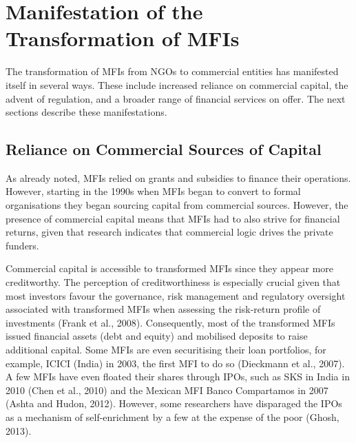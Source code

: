 \documentclass[a4paper, nobind]{templates/ociamthesis}
\begin{document}
\hypertarget{manifestation-of-the-transformation-of-mfis}{%
\section{Manifestation of the Transformation of MFIs}\label{manifestation-of-the-transformation-of-mfis}}

\noindent The transformation of MFIs from NGOs to commercial entities has manifested itself in several ways. These include increased reliance on commercial capital, the advent of regulation, and a broader range of financial services on offer. The next sections describe these manifestations.

\hypertarget{reliance-on-commercial-sources-of-capital}{%
\subsection{Reliance on Commercial Sources of Capital}\label{reliance-on-commercial-sources-of-capital}}

\noindent As already noted, MFIs relied on grants and subsidies to finance their operations. However, starting in the 1990s when MFIs began to convert to formal organisations they began sourcing capital from commercial sources. However, the presence of commercial capital means that MFIs had to also strive for financial returns, given that research indicates that commercial logic drives the private funders.

Commercial capital is accessible to transformed MFIs since they appear more creditworthy. The perception of creditworthiness is especially crucial given that most investors favour the governance, risk management and regulatory oversight associated with transformed MFIs when assessing the risk-return profile of investments (Frank et al., 2008). Consequently, most of the transformed MFIs issued financial assets (debt and equity) and mobilised deposits to raise additional capital. Some MFIs are even securitising their loan portfolios, for example, ICICI (India) in 2003, the first MFI to do so (Dieckmann et al., 2007). A few MFIs have even floated their shares through IPOs, such as SKS in India in 2010 (Chen et al., 2010) and the Mexican MFI Banco Compartamos in 2007 (Ashta and Hudon, 2012). However, some researchers have disparaged the IPOs as a mechanism of self-enrichment by a few at the expense of the poor (Ghosh, 2013).
\end{document}
